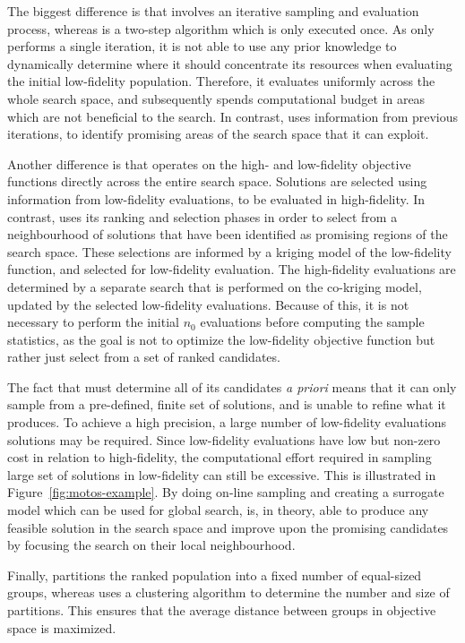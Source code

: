 The biggest difference is that \AlgName{} involves an iterative sampling and evaluation process, whereas \motos{} is a two-step algorithm which is only executed once. As \motos{} only performs a single iteration, it is not able to use any prior knowledge to dynamically determine where it should concentrate its resources when evaluating the initial low-fidelity population. Therefore, it evaluates uniformly across the whole search space, and subsequently spends computational budget in areas which are not beneficial to the search. In contrast, \AlgName{} uses information from previous iterations, to identify promising areas of the search space that it can exploit.

Another difference is that \motos{} operates on the high- and low-fidelity objective functions directly across the entire search space. Solutions are selected using information from low-fidelity evaluations, to be evaluated in high-fidelity. In contrast, \AlgName{} uses its ranking and selection phases in order to select from a neighbourhood of solutions that have been identified as promising regions of the search space. These selections are informed by a kriging model of the low-fidelity function, and selected for low-fidelity evaluation. The high-fidelity evaluations are determined by a separate search that is performed on the co-kriging model, updated by the selected low-fidelity evaluations. Because of this, it is not necessary to perform the initial $n_0$ evaluations before computing the sample statistics, as the goal is not to optimize the low-fidelity objective function but rather just select from a set of ranked candidates.

The fact that \motos{} must determine all of its candidates \emph{a priori} means that it can only sample from a pre-defined, finite set of solutions, and is unable to refine what it produces. To achieve a high precision, a large number of low-fidelity evaluations solutions may be required. Since low-fidelity evaluations have low but non-zero cost in relation to high-fidelity, the computational effort required in sampling large set of solutions in low-fidelity can still be excessive. This is illustrated in Figure~\ref{fig:motos-example}. By doing on-line sampling and creating a surrogate model which can be used for global search, \AlgName{} is, in theory, able to produce any feasible solution in the search space and improve upon the promising candidates by focusing the search on their local neighbourhood.

Finally, \motos{} partitions the ranked population into a fixed number of equal-sized groups, whereas \AlgName{} uses a clustering algorithm to determine the number and size of partitions. This ensures that the average distance between groups in objective space is maximized. %

